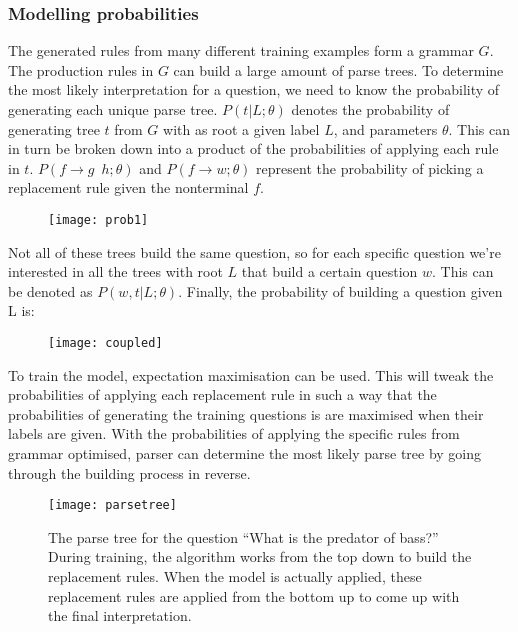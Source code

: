 \subsubsection{Modelling probabilities}
The generated rules from many different training examples form a grammar $G$. The production rules in $G$ can build a large amount of parse trees. To determine the most likely interpretation for a question, we need to know the probability of generating each unique parse tree. $P(t|L; \theta)$ denotes the probability of generating tree $t$ from $G$ with as root a given label $L$, and parameters $\theta$. This can in turn be broken down into a product of the probabilities of applying each rule in $t$. $ P(f \rightarrow g \enspace h; \theta)$ and $ P(f \rightarrow w; \theta)$ represent the probability of picking a replacement rule given the nonterminal $f$.

\begin{figure}[H]
\begin{center}
\texttt{[image: prob1]}
\end{center}
\label{fig:prob1}
\end{figure}

Not all of these trees build the same question, so for each specific question we're interested in all the trees with root $L$ that build a certain question $w$. This can be denoted as $P(w, t|L; \theta)$. Finally, the probability of building a question given L is:

\begin{figure}[H]
\begin{center}
\texttt{[image: coupled]}
\end{center}
\label{fig:coupled}
\end{figure}

To train the model, expectation maximisation can be used. This will tweak the probabilities of applying each replacement rule in such a way that the probabilities of generating the training questions is are maximised when their labels are given. With the probabilities of applying the specific rules from grammar optimised, parser can determine the most likely parse tree by going through the building process in reverse.

\begin{figure}[H]
\texttt{[image: parsetree]}
\caption{The parse tree for the question ``What is the predator of bass?'' During training, the algorithm works from the top down to build the replacement rules. When the model is actually applied, these replacement rules are applied from the bottom up to come up with the final interpretation.}\label{fig:parsetree}
\end{figure}


